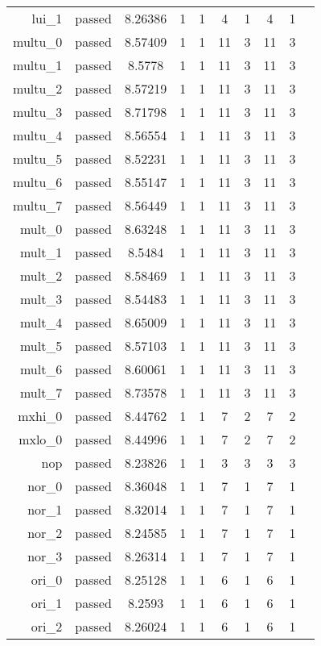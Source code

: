 \begin{longtable}{r|ccccccccc}
    lui\_1 & passed & 8.26386 & 1 & 1 & 4 & 1 & 4 & 1 \\
    multu\_0 & passed & 8.57409 & 1 & 1 & 11 & 3 & 11 & 3 \\
    multu\_1 & passed & 8.5778 & 1 & 1 & 11 & 3 & 11 & 3 \\
    multu\_2 & passed & 8.57219 & 1 & 1 & 11 & 3 & 11 & 3 \\
    multu\_3 & passed & 8.71798 & 1 & 1 & 11 & 3 & 11 & 3 \\
    multu\_4 & passed & 8.56554 & 1 & 1 & 11 & 3 & 11 & 3 \\
    multu\_5 & passed & 8.52231 & 1 & 1 & 11 & 3 & 11 & 3 \\
    multu\_6 & passed & 8.55147 & 1 & 1 & 11 & 3 & 11 & 3 \\
    multu\_7 & passed & 8.56449 & 1 & 1 & 11 & 3 & 11 & 3 \\
    mult\_0 & passed & 8.63248 & 1 & 1 & 11 & 3 & 11 & 3 \\
    mult\_1 & passed & 8.5484 & 1 & 1 & 11 & 3 & 11 & 3 \\
    mult\_2 & passed & 8.58469 & 1 & 1 & 11 & 3 & 11 & 3 \\
    mult\_3 & passed & 8.54483 & 1 & 1 & 11 & 3 & 11 & 3 \\
    mult\_4 & passed & 8.65009 & 1 & 1 & 11 & 3 & 11 & 3 \\
    mult\_5 & passed & 8.57103 & 1 & 1 & 11 & 3 & 11 & 3 \\
    mult\_6 & passed & 8.60061 & 1 & 1 & 11 & 3 & 11 & 3 \\
    mult\_7 & passed & 8.73578 & 1 & 1 & 11 & 3 & 11 & 3 \\
    mxhi\_0 & passed & 8.44762 & 1 & 1 & 7 & 2 & 7 & 2 \\
    mxlo\_0 & passed & 8.44996 & 1 & 1 & 7 & 2 & 7 & 2 \\
    nop & passed & 8.23826 & 1 & 1 & 3 & 3 & 3 & 3 \\
    nor\_0 & passed & 8.36048 & 1 & 1 & 7 & 1 & 7 & 1 \\
    nor\_1 & passed & 8.32014 & 1 & 1 & 7 & 1 & 7 & 1 \\
    nor\_2 & passed & 8.24585 & 1 & 1 & 7 & 1 & 7 & 1 \\
    nor\_3 & passed & 8.26314 & 1 & 1 & 7 & 1 & 7 & 1 \\
    ori\_0 & passed & 8.25128 & 1 & 1 & 6 & 1 & 6 & 1 \\
    ori\_1 & passed & 8.2593 & 1 & 1 & 6 & 1 & 6 & 1 \\
    ori\_2 & passed & 8.26024 & 1 & 1 & 6 & 1 & 6 & 1 \\

\end{longtable}
